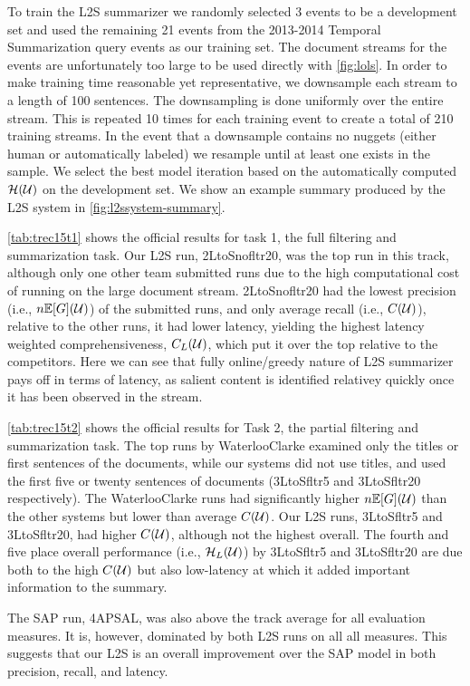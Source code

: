 To train the L2S summarizer we randomly selected 3 events to be a development
set and used the remaining 21 events from the 2013-2014 Temporal Summarization
query events as our training set. The document streams for the events
are unfortunately too large to be used directly with \autoref{fig:lols}.
In order to
 make training time reasonable yet representative, we downsample each stream
 to a length of 100 sentences. The downsampling is done uniformly over the
 entire stream. This is repeated 10 times for each training event to create a
 total of 210 training streams. In the event that a downsample contains no
 nuggets (either human or automatically labeled) we resample until at least
 one exists in the sample. 
 We select the best model iteration based on the automatically computed
$\mathcal{H}(\mathcal{U})$ on the development set.
We show an example summary produced by the L2S system in 
\autoref{fig:l2ssystem-summary}.





\autoref{tab:trec15t1} shows the official results for task 1, the full
filtering and summarization task. Our L2S run, 2LtoSnofltr20, was the top run
in this track, although only one other team submitted runs due to the high
computational cost of running on the large document stream.  2LtoSnofltr20 had
the lowest precision (i.e., $n\mathbb{E}[G](\mathcal{U})$) of the
submitted runs, and only average recall (i.e., $C(\mathcal{U})$),
relative to the other runs, it had lower latency, yielding the highest 
latency weighted comprehensiveness, $C_L(\mathcal{U})$, which 
put it over the top relative to the competitors. Here we can see that 
fully online/greedy nature of L2S summarizer pays off in terms of latency,
as salient content is identified relativey quickly once it has been observed
in the stream.




\autoref{tab:trec15t2} shows the official results for Task 2, the partial
filtering and summarization task. The top runs by WaterlooClarke examined
only the titles or first sentences of the documents, while our systems did not
use titles, and used the first five or twenty sentences of documents (3LtoSfltr5 and
3LtoSfltr20 respectively). The WaterlooClarke runs had significantly
higher $n\mathbb{E}[G](\mathcal{U})$ than the other systems but lower
than average $C(\mathcal{U})$. Our L2S runs, 3LtoSfltr5 and
3LtoSfltr20, had higher $C(\mathcal{U})$, although not the highest overall. The fourth and five place overall performance (i.e., $\mathcal{H}_L(\mathcal{U})$) by 3LtoSfltr5 and
3LtoSfltr20 are due both to the high $C(\mathcal{U})$ but also low-latency at which it added important information to the summary.

The SAP run, 4APSAL, was also above the track average for all evaluation
measures. It is, however, dominated by both L2S runs on all all measures.
This suggests that our L2S is an overall improvement over the SAP model in
both precision, recall, and latency. 




